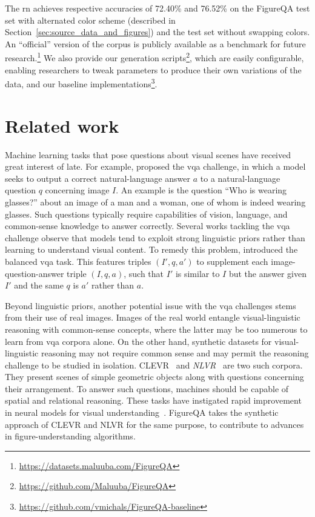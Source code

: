 \documentclass{article} %
\def\bestrntestone{76.52} %
\def\bestrntesttwo{72.40} %
\begin{document}
The \gls{rn} achieves respective accuracies of \bestrntesttwo\% and \bestrntestone\% on the FigureQA test set with alternated color scheme (described in Section~\ref{sec:source_data_and_figures}) and the test set without swapping colors.
An ``official'' version of the corpus is publicly available as a benchmark for future research.\footnote{\url{https://datasets.maluuba.com/FigureQA}} 
We also provide our generation scripts\footnote{\url{https://github.com/Maluuba/FigureQA}}, which are easily configurable, enabling researchers to tweak parameters to produce their own variations of the data, and our baseline implementations\footnote{\url{https://github.com/vmichals/FigureQA-baseline}}.

\section{Related work}
\label{sec:related}
Machine learning tasks that pose questions about visual scenes have received great interest of late.
For example, \citet{antol2015vqa} proposed the \gls{vqa} challenge, in which a model seeks to output a correct natural-language answer $a$ to a natural-language question $q$ concerning image $I$.
An example is the question ``Who is wearing glasses?'' about an image of a man and a woman, one of whom is indeed wearing glasses.
Such questions typically require capabilities of vision, language, and common-sense knowledge to answer correctly.
Several works tackling the \gls{vqa} challenge observe
that models tend to exploit strong linguistic priors rather than learning
to understand visual content. To remedy this problem, \citet{goyal2016making} 
introduced the balanced \gls{vqa} task. This features
triples  $(I', q, a')$ to supplement each image-question-answer triple $(I, q, a)$, 
such that $I'$ is similar to $I$ but the answer given $I'$ and the 
same $q$ is $a'$ rather than $a$.

Beyond linguistic priors, another potential issue with the \gls{vqa} challenges stems from their use of real images.
Images of the real world entangle visual-linguistic reasoning with common-sense concepts,
where the latter may be too numerous to learn from \gls{vqa} corpora alone.
On the other hand, synthetic datasets for visual-linguistic reasoning may not require common sense and may permit the reasoning challenge to be studied in isolation.
CLEVR~\citep{johnson2016clevr} and \emph{NLVR}~\citep{suhr2017corpus} are two such corpora.
They present scenes of simple geometric objects along with questions concerning their arrangement. To answer such questions, machines should be capable of spatial and relational reasoning.
These tasks have instigated rapid improvement in neural models for visual understanding~\citep{santoro2017simple,perez2017learning,hu2017learning}.
FigureQA takes the synthetic approach of CLEVR and NLVR for the same purpose, to contribute to advances in figure-understanding algorithms.
\end{document}
